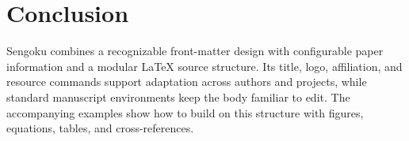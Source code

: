 \section{Conclusion}
\label{sec:conclusion}

Sengoku combines a recognizable front-matter design with configurable paper information and a modular \LaTeX{} source structure. Its title, logo, affiliation, and resource commands support adaptation across authors and projects, while standard manuscript environments keep the body familiar to edit. The accompanying examples show how to build on this structure with figures, equations, tables, and cross-references.
